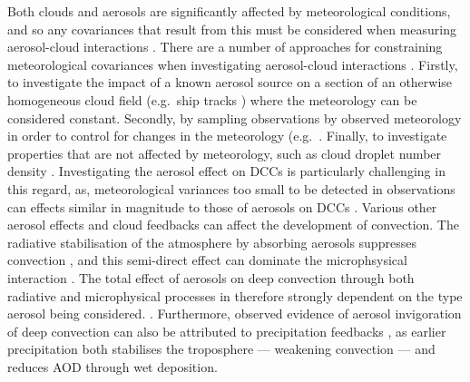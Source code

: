 Both clouds and aerosols are significantly affected by meteorological conditions, and so any covariances that result from this must be considered when measuring aerosol-cloud interactions \citep{gryspeerdt_satellite_2014}.
There are a number of approaches for constraining meteorological covariances when investigating aerosol-cloud interactions \citep{quaas_approaches_2015}.
Firstly, to investigate the impact of a known aerosol source on a section of an otherwise homogeneous cloud field (e.g.\ ship tracks \citep{christensen_ship_2014}) where the meteorology can be considered constant. 
Secondly, by sampling observations by observed meteorology in order to control for changes in the meteorology (e.g.\ \citep{eastman_competing_2018, gryspeerdt_satellite_2014}.
Finally, to investigate properties that are not affected by meteorology, such as cloud droplet number density \citep{gryspeerdt_constraining_2019}. 
Investigating the aerosol effect on DCCs is particularly challenging in this regard, as, meteorological variances too small to be detected in observations can effects similar in magnitude to those of aerosols on DCCs \citep{grabowski_can_2018}.
Various other aerosol effects and cloud feedbacks can affect the development of convection.
The radiative stabilisation of the atmosphere by absorbing aerosols suppresses convection \citep{koren_smoke_2008}, and this semi-direct effect can dominate the microphsysical interaction \citep{fan_effects_2008}.
The total effect of aerosols on deep convection through both radiative and microphysical processes in therefore strongly dependent on the type aerosol being considered. \citep{jiang_contrasting_2018}.
Furthermore, observed evidence of aerosol invigoration of deep convection can also be attributed to precipitation feedbacks \citep{varble_erroneous_2018}, as earlier precipitation both stabilises the troposphere --- weakening convection --- and reduces AOD through wet deposition. 


